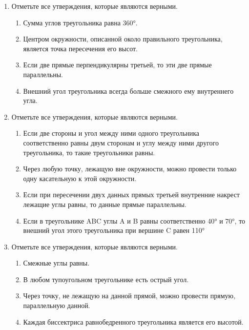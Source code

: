 \documentclass[a4paper,12pt]{article}
\newcommand{\taskspace}{\par\vspace{0.42cm}}
\begin{document}
\begin{enumerate}[resume]
\taskspace

\item Отметьте все утверждения, которые являются верными.
\begin{enumerate}[label=\arabic*),leftmargin=8mm,itemsep=0.25em,topsep=0.35em]
\item Сумма углов треугольника равна 360°.
\item Центром окружности, описанной около правильного треугольника, является точка пересечения его высот.
\item Если две прямые перпендикулярны третьей, то эти две прямые параллельны.
\item Внешний угол треугольника всегда больше смежного ему внутреннего угла.
\end{enumerate}

\taskspace

\item Отметьте все утверждения, которые являются верными.
\begin{enumerate}[label=\arabic*),leftmargin=8mm,itemsep=0.25em,topsep=0.35em]
\item Если две стороны и угол между ними одного треугольника соответственно равны двум сторонам и углу между ними другого треугольника, то такие треугольники равны.
\item Через любую точку, лежащую вне окружности, можно провести только одну касательную к этой окружности.
\item Если при пересечении двух данных прямых третьей внутренние накрест лежащие углы равны, то данные прямые параллельны.
\item Если в треугольнике ABC углы A и B равны соответственно 40° и 70°, то внешний угол этого треугольника при вершине C равен 110°
\end{enumerate}

\taskspace

\item Отметьте все утверждения, которые являются верными.
\begin{enumerate}[label=\arabic*),leftmargin=8mm,itemsep=0.25em,topsep=0.35em]
\item Смежные углы равны.
\item В любом тупоугольном треугольнике есть острый угол.
\item Через точку, не лежащую на данной прямой, можно провести прямую, параллельную данной.
\item Каждая биссектриса равнобедренного треугольника является его высотой.
\end{enumerate}


\end{enumerate}
\end{document}
